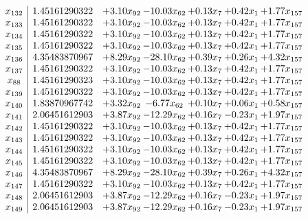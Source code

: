 \documentclass[8pt]{article}
\begin{document}
\[\begin{array}{c| c c@{\hskip 2pt} c@{\hskip 2pt} c@{\hskip 2pt} c@{\hskip 2pt} c@{\hskip 2pt} }
 x_{132}   &  1.45161290322 & +  3.10 x_{92} & -10.03 x_{62} & +  0.13 x_{7} & +  0.42 x_{1} & +  1.77 x_{157}\\
 x_{133}   &  1.45161290322 & +  3.10 x_{92} & -10.03 x_{62} & +  0.13 x_{7} & +  0.42 x_{1} & +  1.77 x_{157}\\
 x_{134}   &  1.45161290322 & +  3.10 x_{92} & -10.03 x_{62} & +  0.13 x_{7} & +  0.42 x_{1} & +  1.77 x_{157}\\
 x_{135}   &  1.45161290322 & +  3.10 x_{92} & -10.03 x_{62} & +  0.13 x_{7} & +  0.42 x_{1} & +  1.77 x_{157}\\
 x_{136}   &  4.35483870967 & +  8.29 x_{92} & -28.10 x_{62} & +  0.39 x_{7} & +  0.26 x_{1} & +  4.32 x_{157}\\
 x_{137}   &  1.45161290322 & +  3.10 x_{92} & -10.03 x_{62} & +  0.13 x_{7} & +  0.42 x_{1} & +  1.77 x_{157}\\
 x_{88}   &  1.45161290323 & +  3.10 x_{92} & -10.03 x_{62} & +  0.13 x_{7} & +  0.42 x_{1} & +  1.77 x_{157}\\
 x_{139}   &  1.45161290322 & +  3.10 x_{92} & -10.03 x_{62} & +  0.13 x_{7} & +  0.42 x_{1} & +  1.77 x_{157}\\
 x_{140}   &  1.83870967742 & +  3.32 x_{92} & -6.77 x_{62} & +  0.10 x_{7} & +  0.06 x_{1} & +  0.58 x_{157}\\
 x_{141}   &  2.06451612903 & +  3.87 x_{92} & -12.29 x_{62} & +  0.16 x_{7} & -0.23 x_{1} & +  1.97 x_{157}\\
 x_{142}   &  1.45161290322 & +  3.10 x_{92} & -10.03 x_{62} & +  0.13 x_{7} & +  0.42 x_{1} & +  1.77 x_{157}\\
 x_{143}   &  1.45161290322 & +  3.10 x_{92} & -10.03 x_{62} & +  0.13 x_{7} & +  0.42 x_{1} & +  1.77 x_{157}\\
 x_{144}   &  1.45161290322 & +  3.10 x_{92} & -10.03 x_{62} & +  0.13 x_{7} & +  0.42 x_{1} & +  1.77 x_{157}\\
 x_{145}   &  1.45161290322 & +  3.10 x_{92} & -10.03 x_{62} & +  0.13 x_{7} & +  0.42 x_{1} & +  1.77 x_{157}\\
 x_{146}   &  4.35483870967 & +  8.29 x_{92} & -28.10 x_{62} & +  0.39 x_{7} & +  0.26 x_{1} & +  4.32 x_{157}\\
 x_{147}   &  1.45161290322 & +  3.10 x_{92} & -10.03 x_{62} & +  0.13 x_{7} & +  0.42 x_{1} & +  1.77 x_{157}\\
 x_{148}   &  2.06451612903 & +  3.87 x_{92} & -12.29 x_{62} & +  0.16 x_{7} & -0.23 x_{1} & +  1.97 x_{157}\\
 x_{149}   &  2.06451612903 & +  3.87 x_{92} & -12.29 x_{62} & +  0.16 x_{7} & -0.23 x_{1} & +  1.97 x_{157}\\

\end{array}\]
\end{document}
